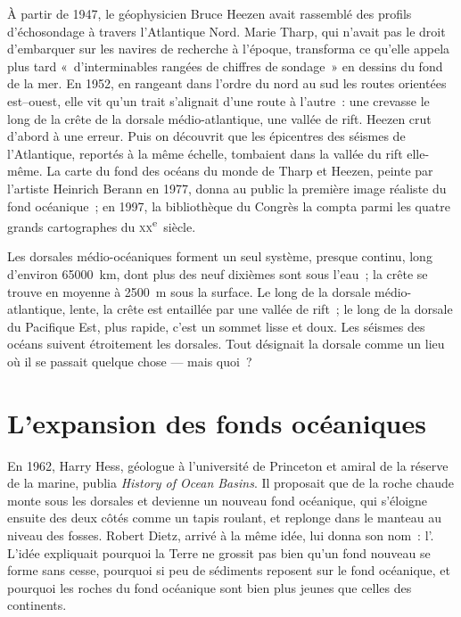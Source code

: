 \begin{history}
À partir de 1947, le géophysicien Bruce Heezen avait rassemblé des profils
d'échosondage à travers l'Atlantique Nord. Marie Tharp, qui n'avait pas le
droit d'embarquer sur les navires de recherche à l'époque, transforma ce
qu'elle appela plus tard «~d'interminables rangées de chiffres de sondage~»
en dessins du fond de la mer. En 1952, en rangeant dans l'ordre du nord au
sud les routes orientées est--ouest, elle vit qu'un trait s'alignait d'une
route à l'autre~: une crevasse le long de la crête de la dorsale
médio-atlantique, une vallée de rift. Heezen crut d'abord à une erreur.
Puis on découvrit que les épicentres des séismes de l'Atlantique, reportés
à la même échelle, tombaient dans la vallée du rift elle-même. La carte du
fond des océans du monde de Tharp et Heezen, peinte par l'artiste Heinrich
Berann en 1977, donna au public la première image réaliste du fond
océanique~; en 1997, la bibliothèque du Congrès la compta parmi les quatre
grands cartographes du \textsc{xx}\textsuperscript{e}~siècle.
\end{history}

Les dorsales médio-océaniques forment un seul système, presque continu,
long d'environ \qty{65000}{km}, dont plus des neuf dixièmes sont sous
l'eau~; la crête se trouve en moyenne à \qty{2500}{m} sous la surface. Le
long de la dorsale médio-atlantique, lente, la crête est entaillée par une
vallée de rift~; le long de la dorsale du Pacifique Est, plus rapide, c'est
un sommet lisse et doux. Les séismes des océans suivent étroitement les
dorsales. Tout désignait la dorsale comme un lieu où il se passait quelque
chose --- mais quoi~?

\section{L'expansion des fonds océaniques}

\begin{history}
En 1962, Harry Hess, géologue à l'université de Princeton et amiral de la
réserve de la marine, publia \emph{History of Ocean Basins}.
Il proposait que de la roche chaude monte sous les dorsales et devienne un
nouveau fond océanique, qui s'éloigne ensuite des deux côtés comme un tapis
roulant, et replonge dans le manteau au niveau des fosses. Robert Dietz,
arrivé à la même idée, lui donna son nom~: l'. L'idée expliquait pourquoi la Terre ne grossit pas bien qu'un
fond nouveau se forme sans cesse, pourquoi si peu de sédiments reposent sur
le fond océanique, et pourquoi les roches du fond océanique sont bien plus
jeunes que celles des continents.
\end{history}

